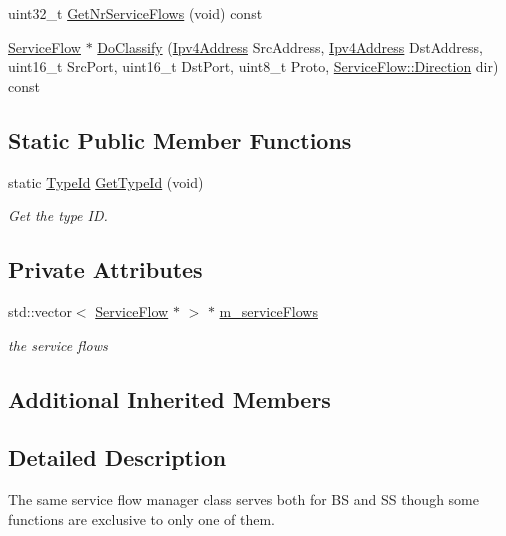 \begin{DoxyCompactItemize}
\item 
uint32\+\_\+t \hyperlink{classns3_1_1ServiceFlowManager_afc76d7d01f4c126c613a5e606f1850a3}{Get\+Nr\+Service\+Flows} (void) const 
\item 
\hyperlink{classns3_1_1ServiceFlow}{Service\+Flow} $\ast$ \hyperlink{classns3_1_1ServiceFlowManager_a55c7a65375483fd6f91685d6ea2f2caa}{Do\+Classify} (\hyperlink{classns3_1_1Ipv4Address}{Ipv4\+Address} Src\+Address, \hyperlink{classns3_1_1Ipv4Address}{Ipv4\+Address} Dst\+Address, uint16\+\_\+t Src\+Port, uint16\+\_\+t Dst\+Port, uint8\+\_\+t Proto, \hyperlink{classns3_1_1ServiceFlow_ae14b8dc8bb371bad10fe078110655d4f}{Service\+Flow\+::\+Direction} dir) const 
\end{DoxyCompactItemize}
\subsection*{Static Public Member Functions}
\begin{DoxyCompactItemize}
\item 
static \hyperlink{classns3_1_1TypeId}{Type\+Id} \hyperlink{classns3_1_1ServiceFlowManager_ab440d5944f601fcbc8c80b4c311ef60f}{Get\+Type\+Id} (void)
\begin{DoxyCompactList}\small\item\em Get the type ID. \end{DoxyCompactList}\end{DoxyCompactItemize}
\subsection*{Private Attributes}
\begin{DoxyCompactItemize}
\item 
std\+::vector$<$ \hyperlink{classns3_1_1ServiceFlow}{Service\+Flow} $\ast$ $>$ $\ast$ \hyperlink{classns3_1_1ServiceFlowManager_abe61764b512c677328f168508b3c3d46}{m\+\_\+service\+Flows}
\begin{DoxyCompactList}\small\item\em the service flows \end{DoxyCompactList}\end{DoxyCompactItemize}
\subsection*{Additional Inherited Members}


\subsection{Detailed Description}
The same service flow manager class serves both for BS and SS though some functions are exclusive to only one of them. 

